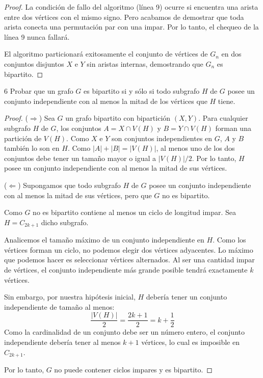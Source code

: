 \begin{proof}
    La condición de fallo del algoritmo (línea 9) ocurre si encuentra una arista entre dos vértices con el mismo signo. Pero acabamos de demostrar que toda arista conecta una permutación par con una impar. Por lo tanto, el chequeo de la línea 9 nunca fallará.

    El algoritmo particionará exitosamente el conjunto de vértices de \(G_n\) en dos conjuntos disjuntos \(X\) e \(Y\) sin aristas internas, demostrando que \(G_n\) es bipartito.
\end{proof}

\clearpage

\begin{ejercicio}{6}
    Probar que un grafo \( G \) es bipartito si y sólo si todo subgrafo \( H \) de \( G \) posee un conjunto independiente con al menos la mitad de los vértices que \( H \) tiene.
\end{ejercicio}
\begin{proof}
    (\( \Longrightarrow \)) Sea \(G\) un grafo bipartito con bipartición \((X, Y)\). Para cualquier subgrafo \(H\) de \(G\), los conjuntos \(A = X \cap V(H)\) y \(B = Y \cap V(H)\) forman una partición de \(V(H)\). Como \(X\) e \(Y\) son conjuntos independientes en \(G\), \(A\) y \(B\) también lo son en \(H\). Como \(|A| + |B| = |V(H)|\), al menos uno de los dos conjuntos debe tener un tamaño mayor o igual a \(|V(H)|/2\). Por lo tanto, \(H\) posee un conjunto independiente con al menos la mitad de sus vértices.

    (\( \Longleftarrow \)) Supongamos que todo subgrafo \(H\) de \(G\) posee un conjunto independiente con al menos la mitad de sus vértices, pero que \(G\) no es bipartito.

    Como \(G\) no es bipartito contiene al menos un ciclo de longitud impar. Sea \( H = C_{2k+1} \) dicho subgrafo.

    Analicemos el tamaño máximo de un conjunto independiente en \(H\). Como los vértices forman un ciclo, no podemos elegir dos vértices adyacentes. Lo máximo que podemos hacer es seleccionar vértices alternados. Al ser una cantidad impar de vértices, el conjunto independiente más grande posible tendrá exactamente \(k\) vértices.

    Sin embargo, por nuestra hipótesis inicial, \(H\) debería tener un conjunto independiente de tamaño al menos:
    \[
        \frac{|V(H)|}{2} = \frac{2k+1}{2} = k + \frac{1}{2}
    \]
    Como la cardinalidad de un conjunto debe ser un número entero, el conjunto independiente debería tener al menos \(k+1\) vértices, lo cual es imposible en \(C_{2k+1}\).

    Por lo tanto, \(G\) no puede contener ciclos impares y es bipartito.
\end{proof}

